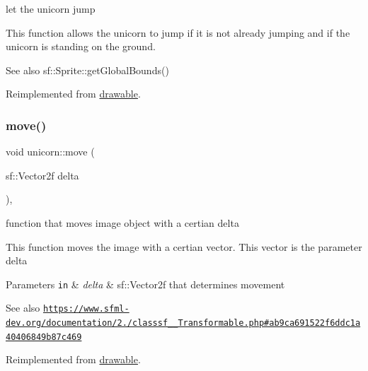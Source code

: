 let the unicorn jump 

This function allows the unicorn to jump if it is not already jumping and if the unicorn is standing on the ground.

\begin{DoxySeeAlso}{See also}
sf\+::\+Sprite\+::get\+Global\+Bounds() 
\end{DoxySeeAlso}


Reimplemented from \hyperlink{classdrawable_ac39691470b7874f5dec59efe649d3981}{drawable}.

\mbox{\label{classunicorn_a162f200a68342f7bc0baaf17c8cf3f9f}} 
\subsubsection{\texorpdfstring{move()}{move()}}
{\footnotesize\ttfamily void unicorn\+::move (\begin{DoxyParamCaption}\item[{sf\+::\+Vector2f}]{delta }\end{DoxyParamCaption})\hspace{0.3cm}{\ttfamily [override]}, {\ttfamily [virtual]}}



function that moves image object with a certian delta 

This function moves the image with a certian vector. This vector is the parameter delta


\begin{DoxyParams}[1]{Parameters}
\mbox{\tt in}  & {\em delta} & sf\+::\+Vector2f that determines movement\\
\hline
\end{DoxyParams}
\begin{DoxySeeAlso}{See also}
\href{https://www.sfml-dev.org/documentation/2.0/classsf_1_1Transformable.php#ab9ca691522f6ddc1a40406849b87c469}{\tt https\+://www.\+sfml-\/dev.\+org/documentation/2./classsf\+\_\+\_\+Transformable.\+php\#ab9ca691522f6ddc1a40406849b87c469} 
\end{DoxySeeAlso}


Reimplemented from \hyperlink{classdrawable_ad0d3930c045cc6776aa2c3965be32491}{drawable}.

\mbox{\label{classunicorn_aadb47a9981c46d6add8704074df117df}} 
